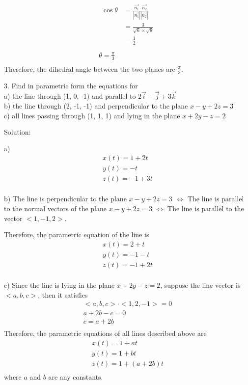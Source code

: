 \documentclass{article}
\begin{document}
\begin{gather*}
  \begin{split}
    \cos\theta &= \frac{\vec{n_1} \cdot \vec{n_2}}{|\vec{n_1}||\vec{n_2}|} \\
               &= \frac{3}{\sqrt{6} \times \sqrt{6}} \\
               &= \frac{1}{2} \\
  \end{split} \\
  \theta = \frac{\pi}{3} \\
\end{gather*}
Therefore, the dihedral angle between the two planes are $\frac{\pi}{3}$.

3. Find in parametric form the equations for \\
a) the line through (1, 0, -1) and parallel to $2\vec{i} - \vec{j} + 3\vec{k}$ \\
b) the line through (2, -1, -1) and perpendicular to the plane $x - y + 2z = 3$ \\
c) all lines passing through (1, 1, 1) and lying in the plane $x + 2y - z = 2$

Solution:

a)
\begin{gather*}
  x(t) = 1 + 2t \\
  y(t) = -t \\
  z(t) = -1 + 3t \\
\end{gather*}

b) 
The line is perpendicular to the plane $x - y + 2z = 3$ 
$\iff$ The line is parallel to the normal vectors of the plane $x - y + 2z = 3$
$\iff$ The line is parallel to the vector $<1, -1, 2>$.

Therefore, the parametric equation of the line is
\begin{gather*}
  x(t) = 2 + t \\
  y(t) = -1 - t \\
  z(t) = -1 + 2t \\
\end{gather*}

c)
Since the line is lying in the plane $x + 2y - z = 2$, suppose the line vector 
is $<a, b, c>$, then it satisfies
\begin{gather*}
  <a, b, c> \cdot <1, 2, -1> = 0 \\
  a + 2b - c = 0 \\
  c = a + 2b \\
\end{gather*}
Therefore, the parametric equations of all lines described above are
\begin{gather*}
  x(t) = 1 + at \\
  y(t) = 1 + bt \\
  z(t) = 1 + (a + 2b)t \\
\end{gather*}
where $a$ and $b$ are any constants.
\end{document}
